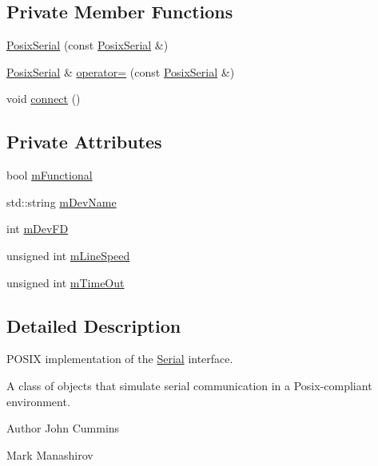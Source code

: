 \subsection*{\-Private \-Member \-Functions}
\begin{DoxyCompactItemize}
\item 
\hyperlink{classmetrobotics_1_1PosixSerial_ac4e722078a8f8a9a435bddc1a025aa0b}{\-Posix\-Serial} (const \hyperlink{classmetrobotics_1_1PosixSerial}{\-Posix\-Serial} \&)
\item 
\hyperlink{classmetrobotics_1_1PosixSerial}{\-Posix\-Serial} \& \hyperlink{classmetrobotics_1_1PosixSerial_aeffe5604a844c22e5a128a90852b91e3}{operator=} (const \hyperlink{classmetrobotics_1_1PosixSerial}{\-Posix\-Serial} \&)
\item 
void \hyperlink{classmetrobotics_1_1PosixSerial_a79115a02df3f543d40ae91d15d7b90c6}{connect} ()
\end{DoxyCompactItemize}
\subsection*{\-Private \-Attributes}
\begin{DoxyCompactItemize}
\item 
bool \hyperlink{classmetrobotics_1_1PosixSerial_a68e19a9a6ed15bd9d0e2a0579a3630a1}{m\-Functional}
\item 
std\-::string \hyperlink{classmetrobotics_1_1PosixSerial_a647c305dbdff7155b9f70503a5a4142b}{m\-Dev\-Name}
\item 
int \hyperlink{classmetrobotics_1_1PosixSerial_a96adceb87053360189a26efb47656750}{m\-Dev\-F\-D}
\item 
unsigned int \hyperlink{classmetrobotics_1_1PosixSerial_acffca69e71f5ced685bb28f185cdc5b1}{m\-Line\-Speed}
\item 
unsigned int \hyperlink{classmetrobotics_1_1PosixSerial_a1e7511b3cf4f30f28285ff7a63036a27}{m\-Time\-Out}
\end{DoxyCompactItemize}


\subsection{\-Detailed \-Description}
\-P\-O\-S\-I\-X implementation of the \hyperlink{classmetrobotics_1_1Serial}{\-Serial} interface. 

\-A class of objects that simulate serial communication in a \-Posix-\/compliant environment. \begin{DoxyAuthor}{\-Author}
\-John \-Cummins 

\-Mark \-Manashirov 
\end{DoxyAuthor}


